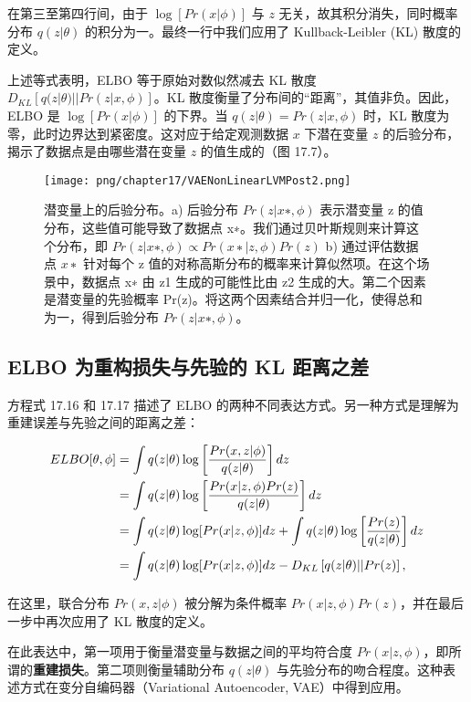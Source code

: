 在第三至第四行间，由于 \(\log[Pr(x|\phi)]\) 与 \(z\) 无关，故其积分消失，同时概率分布 \(q(z|\theta)\) 的积分为一。最终一行中我们应用了 Kullback-Leibler (KL) 散度的定义。

上述等式表明，ELBO 等于原始对数似然减去 KL 散度 \(D_{KL} [ q(z|\theta) || Pr(z|x, \phi) ]\)。KL 散度衡量了分布间的“距离”，其值非负。因此，ELBO 是 \(\log[Pr(x|\phi)]\) 的下界。当 \(q(z|\theta) = Pr(z|x, \phi)\) 时，KL 散度为零，此时边界达到紧密度。这对应于给定观测数据 \(x\) 下潜在变量 \(z\) 的后验分布，揭示了数据点是由哪些潜在变量 \(z\) 的值生成的（图 17.7）。

\begin{figure}[ht!]
\centering
\texttt{[image: png/chapter17/VAENonLinearLVMPost2.png]}
\caption{潜变量上的后验分布。a) 后验分布 \(Pr(z|x∗, \phi)\) 表示潜变量 z 的值分布，这些值可能导致了数据点 x∗。我们通过贝叶斯规则来计算这个分布，即 \(Pr(z|x∗, \phi) \propto Pr(x∗|z, \phi)Pr(z)\) b) 通过评估数据点 \(x∗\) 针对每个 z 值的对称高斯分布的概率来计算似然项。在这个场景中，数据点 x∗ 由 z1 生成的可能性比由 z2 生成的大。第二个因素是潜变量的先验概率 Pr(z)。将这两个因素结合并归一化，使得总和为一，得到后验分布 \(Pr(z|x∗, \phi)\)。}
\end{figure}


\subsection{ELBO 为重构损失与先验的 KL 距离之差}
方程式 17.16 和 17.17 描述了 ELBO 的两种不同表达方式。另一种方式是理解为重建误差与先验之间的距离之差：


\begin{align}
ELBO[\theta, \phi] &= \int q(z|\theta) \log \left[ \frac{Pr(x, z|\phi)}{q(z|\theta)} \right] dz \notag \\
&= \int q(z|\theta) \log \left[ \frac{Pr(x|z, \phi)Pr(z)}{q(z|\theta)} \right] dz \notag \\
&= \int q(z|\theta) \log [Pr(x|z, \phi)] dz + \int q(z|\theta) \log \left[ \frac{Pr(z)}{q(z|\theta)} \right] dz \notag \\
&= \int q(z|\theta) \log [Pr(x|z, \phi)] dz - D_{KL} \left[ q(z|\theta) || Pr(z) \right], 
\end{align} 


在这里，联合分布 \(Pr(x, z|\phi)\) 被分解为条件概率 \(Pr(x|z, \phi)Pr(z)\)，并在最后一步中再次应用了 KL 散度的定义。

在此表达中，第一项用于衡量潜变量与数据之间的平均符合度 \(Pr(x|z, \phi)\)，即所谓的\textbf{重建损失}。第二项则衡量辅助分布 \(q(z|\theta)\) 与先验分布的吻合程度。这种表述方式在变分自编码器（Variational Autoencoder, VAE）中得到应用。


